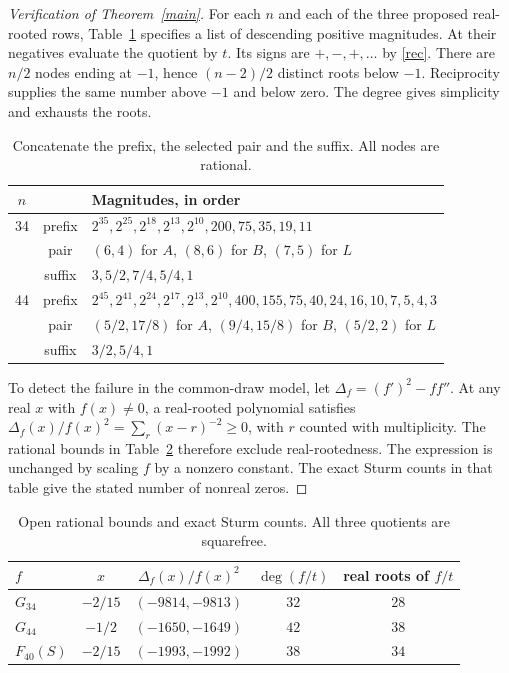 \documentclass[10pt,a4paper]{article}
\begin{document}
\begin{proof}[Verification of Theorem~\ref{main}]
For each $n$ and each of the three proposed real-rooted rows, Table~\ref{nodes} specifies a list of descending positive magnitudes. At their negatives evaluate the quotient by $t$. Its signs are $+,-,+,\ldots$ by \eqref{rec}. There are $n/2$ nodes ending at $-1$, hence $(n-2)/2$ distinct roots below $-1$. Reciprocity supplies the same number above $-1$ and below zero. The degree gives simplicity and exhausts the roots.

\begin{table}[ht]
\centering\small
\begin{tabular}{@{}ccl@{}}
\hline
$n$ & & Magnitudes, in order \\ \hline
34 & prefix & $2^{35},2^{25},2^{18},2^{13},2^{10},200,75,35,19,11$\\
   & pair & $(6,4)$ for $A$, $(8,6)$ for $B$, $(7,5)$ for $L$\\
   & suffix & $3,5/2,7/4,5/4,1$\\
44 & prefix & $2^{45},2^{41},2^{24},2^{17},2^{13},2^{10},400,155,75,40,24,16,10,7,5,4,3$\\
   & pair & $(5/2,17/8)$ for $A$, $(9/4,15/8)$ for $B$, $(5/2,2)$ for $L$\\
   & suffix & $3/2,5/4,1$\\ \hline
\end{tabular}
\caption{Concatenate the prefix, the selected pair and the suffix. All nodes are rational.}\label{nodes}
\end{table}

To detect the failure in the common-draw model, let $\Delta_f=(f')^2-ff''$. At any real $x$ with $f(x)\ne0$, a real-rooted polynomial satisfies $\Delta_f(x)/f(x)^2=\sum_{r}(x-r)^{-2}\ge0$, with $r$ counted with multiplicity. The rational bounds in Table~\ref{gap} therefore exclude real-rootedness. The expression is unchanged by scaling $f$ by a nonzero constant. The exact Sturm counts in that table give the stated number of nonreal zeros.
\end{proof}

\begin{table}[ht]
\centering
\begin{tabular}{@{}lcccc@{}}
\hline
$f$ & $x$ & $\Delta_f(x)/f(x)^2$ & $\deg(f/t)$ & real roots of $f/t$\\ \hline
$G_{34}$ & $-2/15$ & $(-9814,-9813)$ & $32$ & $28$\\
$G_{44}$ & $-1/2$  & $(-1650,-1649)$ & $42$ & $38$\\
$F_{40}(S)$ & $-2/15$ & $(-1993,-1992)$ & $38$ & $34$\\ \hline
\end{tabular}
\caption{Open rational bounds and exact Sturm counts. All three quotients are squarefree.}\label{gap}
\end{table}
\end{document}
